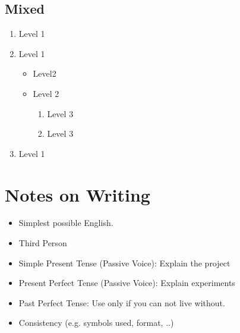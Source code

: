  
 \subsection{Mixed}
 
 \begin{enumerate}
  \item Level 1
 \item Level 1
  		\begin{itemize}
  		 \item Level2
  		 \item Level 2
  		 		\begin{enumerate}
  		 		\item Level 3
  		 		\item Level 3
  				\end{enumerate}
  		\end{itemize}
 \item Level 1
 \end{enumerate}

\section{Notes on Writing}
\begin{itemize}
 \item Simplest possible English.
 \item Third Person
 \item Simple Present Tense (Passive Voice): Explain the project
 \item Present Perfect Tense (Passive Voice): Explain experiments
 \item Past Perfect Tense: Use only if you can not live without.
 \item Consistency (e.g. symbols used, format, ..)
\end{itemize}



